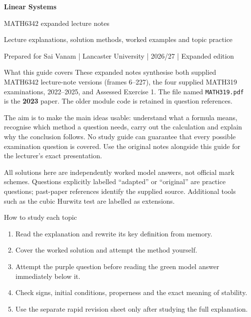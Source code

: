 
\renewcommand{\topic}[1]{\par\Needspace{10\baselineskip}\section{#1}}

\begin{tcolorbox}[colback=navy,coltext=white,colframe=navy]
{\Huge\bfseries Linear Systems}\par\bigskip
{\Large MATH6342 expanded lecture notes}\par
Lecture explanations, solution methods, worked examples and topic practice\par\bigskip
Prepared for Sai Vanam | Lancaster University | 2026/27 | Expanded edition
\end{tcolorbox}
\begin{concept}{What this guide covers}
These expanded notes synthesise both supplied MATH6342 lecture-note versions (frames 6--227), the four supplied MATH319 examinations, 2022--2025, and Assessed Exercise 1. The file named \texttt{MATH319.pdf} is the \textbf{2023} paper. The older module code is retained in question references.

The aim is to make the main ideas usable: understand what a formula means, recognise which method a question needs, carry out the calculation and explain why the conclusion follows. No study guide can guarantee that every possible examination question is covered. Use the original notes alongside this guide for the lecturer's exact presentation.

All solutions here are independently worked model answers, not official mark schemes. Questions explicitly labelled ``adapted'' or ``original'' are practice questions; past-paper references identify the supplied source. Additional tools such as the cubic Hurwitz test are labelled as extensions.
\end{concept}
\begin{method}{How to study each topic}
\begin{enumerate}
\item Read the explanation and rewrite its key definition from memory.
\item Cover the worked solution and attempt the method yourself.
\item Attempt the purple question before reading the green model answer immediately below it.
\item Check signs, initial conditions, properness and the exact meaning of stability.
\item Use the separate rapid revision sheet only after studying the full explanation.
\end{enumerate}
\end{method}
